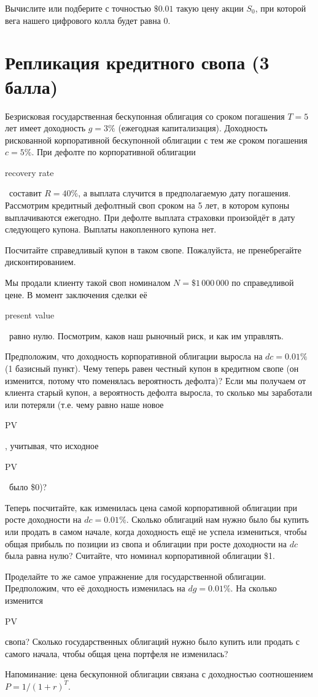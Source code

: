\documentclass[a4paper,14pt]{extarticle}
\newcommand{\en}[1]{\begin{otherlanguage}{english}#1\end{otherlanguage}}
\begin{document}
Вычислите или подберите с точностью $\$0.01$ такую цену акции $S_0$, при которой вега нашего цифрового колла будет равна 0.

\section{Репликация кредитного свопа (3 балла)}

Безрисковая государственная бескупонная облигация со сроком погашения $T=5$ лет имеет
доходность $g=3\%$ (ежегодная капитализация). Доходность рискованной корпоративной 
бескупонной облигации с тем же сроком погашения $c=5\%$. При дефолте по корпоративной
облигации \en{recovery rate}\ составит $R=40\%$, а выплата случится в предполагаемую 
дату погашения. Рассмотрим кредитный дефолтный своп сроком на 5 лет, в котором купоны выплачиваются 
ежегодно. При дефолте выплата страховки произойдёт в дату следующего купона. Выплаты
накопленного купона нет.

Посчитайте справедливый купон в таком свопе. Пожалуйста, не пренебрегайте 
дисконтированием.

Мы продали клиенту такой своп номиналом $N=\$1\,000\,000$ по справедливой 
цене. В момент заключения сделки её \en{present value}\ равно нулю. Посмотрим, каков наш 
рыночный риск, и как им управлять.

Предположим, что доходность корпоративной облигации выросла на $dc=0.01\%$ (1 базисный 
пункт). Чему теперь равен честный купон в кредитном свопе (он изменится, потому что 
поменялась вероятность дефолта)? Если мы получаем от клиента старый купон, а вероятность 
дефолта выросла, то сколько мы заработали или потеряли (т.е. чему равно наше новое 
\en{PV}, учитывая, что исходное \en{PV}\ было \$0)? 

Теперь посчитайте, как изменилась цена самой корпоративной облигации при росте 
доходности на $dc=0.01\%$. Сколько облигаций нам нужно было бы купить или продать в самом начале, когда доходность ещё не успела измениться, чтобы общая прибыль по позиции из свопа и облигации при росте доходности на $dc$ была равна нулю? Считайте, что номинал корпоративной облигации \$1.

Проделайте то же самое упражнение для государственной облигации. Предположим, что её доходность изменилась на $dg=0.01\%$. На сколько изменится  \en{PV} свопа? Сколько государственных облигаций нужно было купить или продать с самого начала, чтобы общая цена портфеля не изменилась?

Напоминание: цена бескупонной облигации связана с доходностью соотношением $P = 1/(1+r)^T$.
\end{document}
